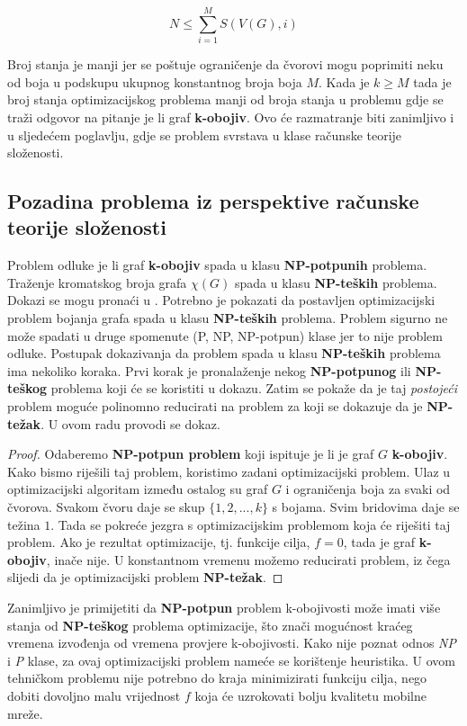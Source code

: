 \documentclass[times, utf8, diplomski, numeric]{fer}
\begin{document}
\begin{equation}
N \le \sum_{i=1}^{M} S(V(G), i)
\end{equation}

Broj stanja je manji jer se poštuje ograničenje da čvorovi mogu poprimiti neku od boja u podskupu ukupnog konstantnog broja boja $M$. Kada je $k\ge M$ tada je broj stanja optimizacijskog problema manji od broja stanja u problemu gdje se traži odgovor na pitanje je li graf \textbf{k-obojiv}. Ovo će razmatranje biti zanimljivo i u sljedećem poglavlju, gdje se problem svrstava u klase računske teorije složenosti.

\subsection{Pozadina problema iz perspektive računske teorije složenosti}

Problem odluke je li graf \textbf{k-obojiv} spada u klasu \textbf{NP-potpunih} problema. Traženje kromatskog broja grafa $\chi(G)$ spada u klasu \textbf{NP-teških} problema. Dokazi se mogu pronaći u \cite{lit16}. Potrebno je pokazati da postavljen optimizacijski problem bojanja grafa spada u klasu \textbf{NP-teških} problema. Problem sigurno ne može spadati u druge spomenute (P, NP, NP-potpun) klase jer to nije problem odluke.
Postupak dokazivanja da problem spada u klasu \textbf{NP-teških} problema ima nekoliko koraka. Prvi korak je pronalaženje nekog \textbf{NP-potpunog} ili \textbf{NP-teškog} problema koji će se koristiti u dokazu. Zatim se pokaže da je taj \emph{postojeći} problem moguće polinomno reducirati na problem za koji se dokazuje da je \textbf{NP-težak}. U ovom radu provodi se dokaz. 

\begin{proof}
Odaberemo \textbf{NP-potpun problem} koji ispituje je li je graf $G$ \textbf{k-obojiv}. Kako bismo riješili taj problem, koristimo zadani optimizacijski problem. Ulaz u optimizacijski algoritam između ostalog su graf $G$ i ograničenja boja za svaki od čvorova. Svakom čvoru daje se skup $\{1,2,...,k\}$ s bojama. Svim bridovima daje se težina $1$. Tada se pokreće jezgra s optimizacijskim problemom koja će riješiti taj problem. Ako je rezultat optimizacije, tj. funkcije cilja, $f=0$, tada je graf \textbf{k-obojiv}, inače nije. U konstantnom vremenu možemo reducirati problem, iz čega slijedi da je optimizacijski problem \textbf{NP-težak}.  
\end{proof}

Zanimljivo je primijetiti da \textbf{NP-potpun} problem k-obojivosti može imati više stanja od \textbf{NP-teškog} problema optimizacije, što znači mogućnost kraćeg vremena izvođenja od vremena provjere k-obojivosti. Kako nije poznat odnos \emph{NP} i \emph{P} klase, za ovaj optimizacijski problem nameće se korištenje heuristika. U ovom tehničkom problemu nije potrebno do kraja minimizirati funkciju cilja, nego dobiti dovoljno malu vrijednost $f$ koja će uzrokovati bolju kvalitetu mobilne mreže. 
\end{document}
